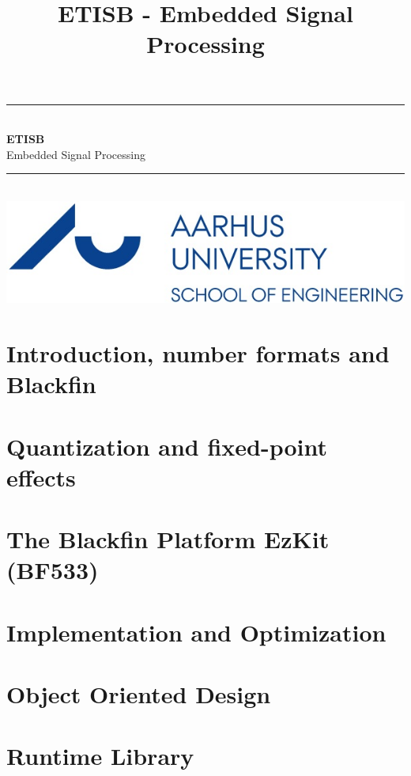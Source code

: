 \documentclass[12pt,a4paper,danish,oneside]{book}
\title{ETISB - Embedded Signal Processing}
\newcommand{\HRule}{\rule{\linewidth}{0.5mm}}
\begin{document}
\begin{titlepage}
	\clearpage\thispagestyle{empty}
	\begin{center}
		\HRule \\[0.4cm]
		{\huge \bfseries ETISB} \\[.3cm] {\huge Embedded Signal Processing}\\[0cm]
		\HRule \\[3.4cm]
		\includegraphics[width=0.5\linewidth]{graphics/au}
	\end{center}
\end{titlepage}

\tableofcontents

\chapter{Introduction, number formats and Blackfin}


\chapter{Quantization and fixed-point effects}


\chapter{The Blackfin Platform EzKit (BF533)}


\chapter{Implementation and Optimization}


\chapter{Object Oriented Design}


\chapter{Runtime Library}

\end{document}
